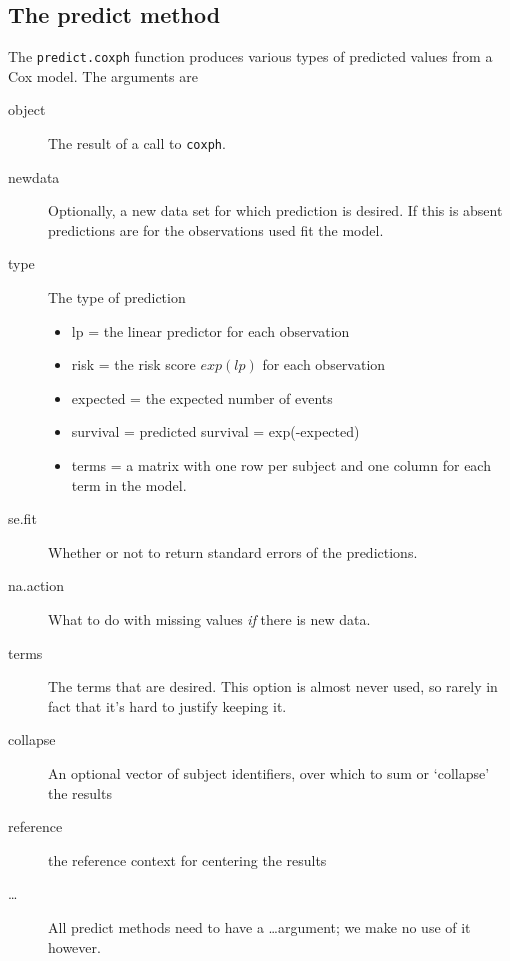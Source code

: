 \documentclass{article}
\newcommand{\code}[1]{\texttt{#1}}
\begin{document}
\subsection{The predict method}
The \code{predict.coxph} function
produces various types of predicted values from a Cox model.
The arguments are
\begin{description}
  \item [object] The result of a call to \code{coxph}.
  \item [newdata] Optionally, a new data set for which prediction is
    desired.  If this is absent predictions are for the observations used 
    fit the model.
  \item[type] The type of prediction
    \begin{itemize}
      \item lp = the linear predictor for each observation
      \item risk = the risk score $exp(lp)$ for each observation
      \item expected = the expected number of events
      \item survival = predicted survival = exp(-expected)
      \item terms = a matrix with one row per subject and one column for
        each term in the model.
    \end{itemize}
  \item[se.fit] Whether or not to return standard errors of the predictions.
  \item[na.action] What to do with missing values \emph{if} there is new
    data. 
 \item[terms] The terms that are desired.  This option is almost never used,
    so rarely in fact that it's hard to justify keeping it.
  \item[collapse] An optional vector of subject identifiers, over which to
    sum or `collapse' the results
  \item[reference] the reference context for centering the results
  \item[\ldots] All predict methods need to have a \ldots argument; we make
    no use of it however.
\end{description}
\end{document}
